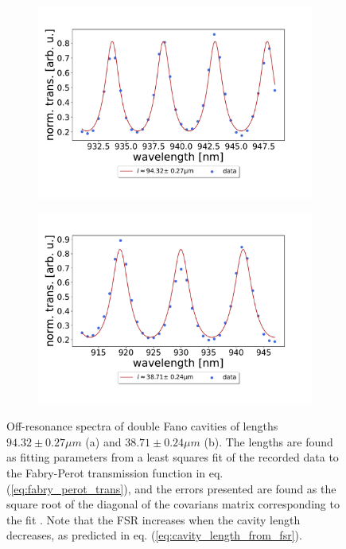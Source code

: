 \begin{figure}[h!]
    \centering
    \begin{subfigure}[b]{0.49\textwidth}
        \includegraphics[width=\textwidth]{figures/length_from_fsr_example_100um.pdf}
        \caption{}
        \label{fig:100um_FSR}
    \end{subfigure}
    \begin{subfigure}[b]{0.49\textwidth}
        \includegraphics[width=\textwidth]{figures/length_from_fsr_example_40um.pdf}
        \caption{}
        \label{fig:40um_FSR}
    \end{subfigure}
    \caption{Off-resonance spectra of double Fano cavities of lengths $94.32 \pm 0.27 \mu m$ (a) and $38.71 \pm 0.24 \mu m$ (b). The lengths are found as fitting parameters from a least squares fit of the recorded data to the Fabry-Perot transmission function in eq. (\ref{eq:fabry_perot_trans}), and the errors presented are found as the square root of the diagonal of the covarians matrix corresponding to the fit \cite{Hughes}. Note that the FSR increases when the cavity length decreases, as predicted in eq. (\ref{eq:cavity_length_from_fsr}).}
    \label{fig:length_from_long_scan_example}    
\end{figure}


